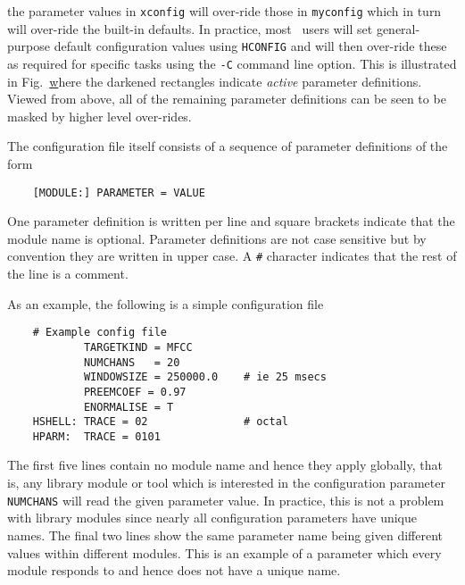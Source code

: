 \noindent
the parameter values in \texttt{xconfig} will over-ride those in 
\texttt{myconfig} which in turn will over-ride the built-in defaults.
In practice, most \HTK\ users will set general-purpose
default configuration values using \texttt{HCONFIG} and will then over-ride
these as required for specific tasks using the \texttt{-C} command line option.
This is illustrated in Fig.~\href{f:Config} where the darkened rectangles
indicate \textit{active} parameter definitions.
Viewed from above, 
all of the remaining parameter definitions can be seen to be masked by
higher level over-rides.

The configuration file itself consists of a sequence of parameter
definitions of the form
\begin{verbatim}
    [MODULE:] PARAMETER = VALUE
\end{verbatim}
One parameter definition is written per line and square brackets
indicate that the module name is
optional. Parameter definitions are not case sensitive
but by convention they are written in upper case.  A \verb+#+ character 
indicates that the rest of the line is a comment.

As an example, the following is a simple configuration file
\begin{verbatim}
    # Example config file
            TARGETKIND = MFCC
            NUMCHANS   = 20
            WINDOWSIZE = 250000.0    # ie 25 msecs
            PREEMCOEF = 0.97
            ENORMALISE = T
    HSHELL: TRACE = 02               # octal
    HPARM:  TRACE = 0101
\end{verbatim}
The first five lines contain no module name and hence they apply
globally, that is, any library module or tool which is interested
in the configuration parameter \texttt{NUMCHANS} will read the given
parameter value.  In practice, this is not a problem with library modules
since nearly all configuration parameters have unique
names.  The final two lines show the same parameter name being given
different values within different modules.  This is an example of
a parameter which every module responds to and hence does not have a unique
name.

